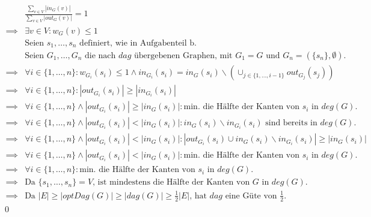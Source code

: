 \begin{align*}
	&\frac{\sum_{v \in V} |in_G(v)|}{\sum_{v \in V} |out_G(v)|} = 1 \\
	\implies &\exists v \in V: w_G(v) \le 1 \\
	&\text{Seien } s_1, \dots, s_n \text{ definiert, wie in Aufgabenteil b.} \\
	&\text{Seien } G_1, \dots, G_n \text{ die nach $dag$ übergebenen Graphen, mit $G_1 = G$ und $G_n = (\{ s_n \}, \emptyset)$.} \\
	\implies &\forall i \in \{ 1, \dots, n \}: w_{G_i}(s_i) \le 1 \land in_{G_i}(s_i) = in_G(s_i) \backslash (\cup_{j \in \{ 1, \dots, i-1 \}} out_{G_j}(s_j)) \\
	\implies &\forall i \in \{ 1, \dots, n \}: |out_{G_i}(s_i)| \ge |in_{G_i}(s_i)| \\
	\implies &\forall i \in \{ 1, \dots, n \} \land |out_{G_i}(s_i)| \ge |in_G(s_i)|: \text{min. die Hälfte der Kanten von $s_i$ in $deg(G)$.} \\
	\implies &\forall i \in \{ 1, \dots, n \} \land |out_{G_i}(s_i)| < |in_G(s_i)|: in_G(s_i) \backslash in_{G_i}(s_i) \text{ sind bereits in $deg(G)$.} \\
	\implies &\forall i \in \{ 1, \dots, n \} \land |out_{G_i}(s_i)| < |in_G(s_i)|: |out_{G_i}(s_i) \cup in_G(s_i) \backslash in_{G_i}(s_i)| \ge |in_G(s_i)| \\
	\implies &\forall i \in \{ 1, \dots, n \} \land |out_{G_i}(s_i)| < |in_G(s_i)|: \text{min. die Hälfte der Kanten von $s_i$ in $deg(G)$.} \\
	\implies &\forall i \in \{ 1, \dots, n \}: \text{min. die Hälfte der Kanten von $s_i$ in $deg(G)$.} \\
	\implies &\text{Da $\{ s_1, \dots, s_n \} = V$, ist mindestens die Hälfte der Kanten von $G$ in $deg(G)$.} \\
	\implies &\text{Da $|E| \ge |optDag(G)| \ge |dag(G)| \ge \frac{1}{2} |E|$, hat $dag$ eine Güte von $\frac{1}{2}$.}
\end{align*}
\qed


